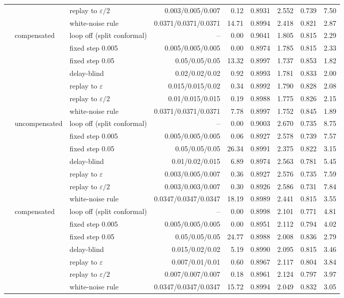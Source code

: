 \begin{tabular}{@{}rllrrrrrr@{}}
 &  & replay to $\varepsilon/2$ & 0.003/0.005/0.007 & 0.12 & 0.8931 & 2.552 & 0.739 & 7.50 \\
 &  & white-noise rule & 0.0371/0.0371/0.0371 & 14.71 & 0.8994 & 2.418 & 0.821 & 2.87 \\
 & compensated & loop off (split conformal) & -- & 0.00 & 0.9041 & 1.805 & 0.815 & 2.29 \\
 &  & fixed step 0.005 & 0.005/0.005/0.005 & 0.00 & 0.8974 & 1.785 & 0.815 & 2.33 \\
 &  & fixed step 0.05 & 0.05/0.05/0.05 & 13.32 & 0.8997 & 1.737 & 0.853 & 1.82 \\
 &  & delay-blind & 0.02/0.02/0.02 & 0.92 & 0.8993 & 1.781 & 0.833 & 2.00 \\
 &  & replay to $\varepsilon$ & 0.015/0.015/0.02 & 0.34 & 0.8992 & 1.790 & 0.828 & 2.08 \\
 &  & replay to $\varepsilon/2$ & 0.01/0.015/0.015 & 0.19 & 0.8988 & 1.775 & 0.826 & 2.15 \\
 &  & white-noise rule & 0.0371/0.0371/0.0371 & 7.78 & 0.8997 & 1.752 & 0.845 & 1.89 \\
\addlinespace
4 & uncompensated & loop off (split conformal) & -- & 0.00 & 0.9003 & 2.670 & 0.735 & 8.75 \\
 &  & fixed step 0.005 & 0.005/0.005/0.005 & 0.06 & 0.8927 & 2.578 & 0.739 & 7.57 \\
 &  & fixed step 0.05 & 0.05/0.05/0.05 & 26.34 & 0.8991 & 2.375 & 0.822 & 3.15 \\
 &  & delay-blind & 0.01/0.02/0.015 & 6.89 & 0.8974 & 2.563 & 0.781 & 5.45 \\
 &  & replay to $\varepsilon$ & 0.003/0.005/0.007 & 0.36 & 0.8927 & 2.576 & 0.735 & 7.59 \\
 &  & replay to $\varepsilon/2$ & 0.003/0.003/0.007 & 0.30 & 0.8926 & 2.586 & 0.731 & 7.84 \\
 &  & white-noise rule & 0.0347/0.0347/0.0347 & 18.19 & 0.8989 & 2.441 & 0.815 & 3.55 \\
 & compensated & loop off (split conformal) & -- & 0.00 & 0.8998 & 2.101 & 0.771 & 4.81 \\
 &  & fixed step 0.005 & 0.005/0.005/0.005 & 0.00 & 0.8951 & 2.112 & 0.794 & 4.02 \\
 &  & fixed step 0.05 & 0.05/0.05/0.05 & 24.77 & 0.8988 & 2.008 & 0.836 & 2.79 \\
 &  & delay-blind & 0.015/0.02/0.02 & 5.19 & 0.8990 & 2.095 & 0.815 & 3.46 \\
 &  & replay to $\varepsilon$ & 0.007/0.01/0.01 & 0.60 & 0.8967 & 2.117 & 0.804 & 3.84 \\
 &  & replay to $\varepsilon/2$ & 0.007/0.007/0.007 & 0.18 & 0.8961 & 2.124 & 0.797 & 3.97 \\
 &  & white-noise rule & 0.0347/0.0347/0.0347 & 15.72 & 0.8994 & 2.049 & 0.832 & 3.05 \\
\bottomrule
\end{tabular}
